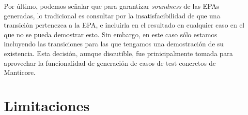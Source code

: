 Por último, podemos señalar que para garantizar \textit{soundness} de las EPAs generadas, lo tradicional es consultar por la insatisfacibilidad de que una transición pertenezca a la EPA, e incluirla en el resultado en cualquier caso en el que no se pueda demostrar esto.
Sin embargo, en este caso sólo estamos incluyendo las transiciones para las que tengamos una demostración de su existencia.
Esta decisión, aunque discutible, fue prinicipalmente tomada para aprovechar la funcionalidad de generación de casos de test concretos de Manticore.




\section{Limitaciones}
